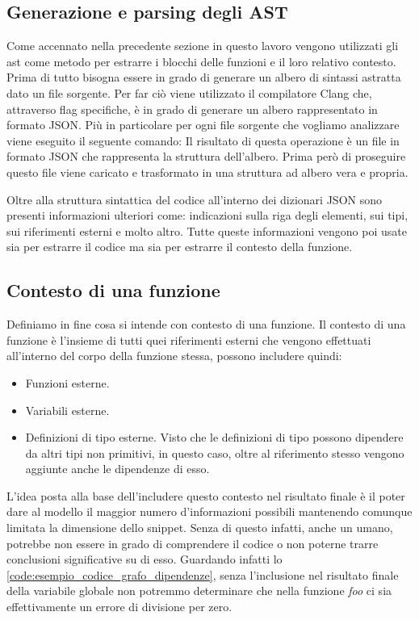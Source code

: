 \subsection{Generazione e parsing degli AST}
Come accennato nella precedente sezione in questo lavoro vengono utilizzati gli ast come metodo per estrarre i blocchi delle funzioni e il loro relativo contesto.
Prima di tutto bisogna essere in grado di generare un albero di sintassi astratta dato un file sorgente.
Per far ciò viene utilizzato il compilatore Clang che, attraverso flag specifiche, è in grado di generare un albero rappresentato in formato JSON.
Più in particolare per ogni file sorgente che vogliamo analizzare viene eseguito il seguente comando:
Il risultato di questa operazione è un file in formato JSON che rappresenta la struttura dell'albero. Prima però di proseguire questo file viene caricato e trasformato in una struttura ad albero vera e propria.

Oltre alla struttura sintattica del codice all'interno dei dizionari JSON sono presenti informazioni ulteriori come: indicazioni sulla riga degli elementi, sui tipi, sui riferimenti esterni e molto altro.
Tutte queste informazioni vengono poi usate sia per estrarre il codice ma sia per estrarre il contesto della funzione. 

\subsection{Contesto di una funzione}
Definiamo in fine cosa si intende con contesto di una funzione.
Il contesto di una funzione è l'insieme di tutti quei riferimenti esterni che vengono effettuati all'interno del corpo della funzione stessa, possono includere quindi:
  \begin{itemize}
    \item Funzioni esterne.
    \item Variabili esterne.
    \item Definizioni di tipo esterne. Visto che le definizioni di tipo possono dipendere da altri tipi non primitivi, in questo caso, oltre al riferimento stesso vengono aggiunte anche le dipendenze di esso.
  \end{itemize}
L'idea posta alla base dell'includere questo contesto nel risultato finale è il poter dare al modello il maggior numero d'informazioni possibili mantenendo comunque limitata la dimensione dello snippet.
Senza di questo infatti, anche un umano, potrebbe non essere in grado di comprendere il codice o non poterne trarre conclusioni significative su di esso. 
Guardando infatti lo \autoref{code:esempio_codice_grafo_dipendenze}, senza l'inclusione nel risultato finale della variabile globale non potremmo determinare che nella funzione \textit{foo} ci sia effettivamente un errore di divisione per zero.

